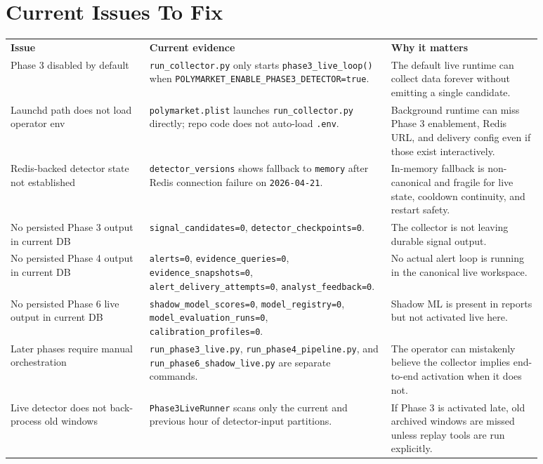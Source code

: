 \documentclass{article}
\begin{document}
\section*{Current Issues To Fix}
\begin{longtable}{p{0.23\linewidth}p{0.40\linewidth}p{0.25\linewidth}}
\textbf{Issue} & \textbf{Current evidence} & \textbf{Why it matters} \\
Phase 3 disabled by default & \texttt{run\_collector.py} only starts \texttt{phase3\_live\_loop()} when \texttt{POLYMARKET\_ENABLE\_PHASE3\_DETECTOR=true}. & The default live runtime can collect data forever without emitting a single candidate. \\
Launchd path does not load operator env & \texttt{polymarket.plist} launches \texttt{run\_collector.py} directly; repo code does not auto-load \texttt{.env}. & Background runtime can miss Phase 3 enablement, Redis URL, and delivery config even if those exist interactively. \\
Redis-backed detector state not established & \texttt{detector\_versions} shows fallback to \texttt{memory} after Redis connection failure on \texttt{2026-04-21}. & In-memory fallback is non-canonical and fragile for live state, cooldown continuity, and restart safety. \\
No persisted Phase 3 output in current DB & \texttt{signal\_candidates=0}, \texttt{detector\_checkpoints=0}. & The collector is not leaving durable signal output. \\
No persisted Phase 4 output in current DB & \texttt{alerts=0}, \texttt{evidence\_queries=0}, \texttt{evidence\_snapshots=0}, \texttt{alert\_delivery\_attempts=0}, \texttt{analyst\_feedback=0}. & No actual alert loop is running in the canonical live workspace. \\
No persisted Phase 6 live output in current DB & \texttt{shadow\_model\_scores=0}, \texttt{model\_registry=0}, \texttt{model\_evaluation\_runs=0}, \texttt{calibration\_profiles=0}. & Shadow ML is present in reports but not activated live here. \\
Later phases require manual orchestration & \texttt{run\_phase3\_live.py}, \texttt{run\_phase4\_pipeline.py}, and \texttt{run\_phase6\_shadow\_live.py} are separate commands. & The operator can mistakenly believe the collector implies end-to-end activation when it does not. \\
Live detector does not back-process old windows & \texttt{Phase3LiveRunner} scans only the current and previous hour of detector-input partitions. & If Phase 3 is activated late, old archived windows are missed unless replay tools are run explicitly. \\

\end{longtable}
\end{document}
